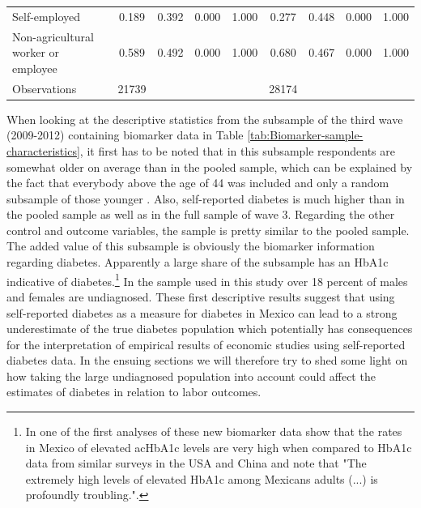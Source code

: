 \documentclass[12pt,english,british]{article}
\begin{document}
\begin{table}[h]
\begin{center}
\begin{adjustbox}{max width=\textwidth}
{\begin{tabular}{l*{2}{cccc}}
Self-employed       &       0.189&       0.392&       0.000&       1.000&       0.277&       0.448&       0.000&       1.000\\
Non-agricultural worker or employee&       0.589&       0.492&       0.000&       1.000&       0.680&       0.467&       0.000&       1.000\\
\midrule
Observations        &       21739&            &            &            &       28174&            &            &            \\
\bottomrule
\end{tabular}%
}
\end{adjustbox}
\end{center}


\end{table}

When looking at the descriptive statistics from the subsample of the third wave (2009-2012) containing biomarker data in Table \ref{tab:Biomarker-sample-characteristics}, it first has to be noted that in this subsample respondents are somewhat older on average than in the pooled sample, which can be explained by the fact that everybody above the age of 44 was included and only a random subsample of those younger \cite{Crimmins2015}. Also, self-reported diabetes is much higher than in the pooled sample as well as in the full sample of wave 3. Regarding the other control and outcome variables, the sample is pretty similar to the pooled sample. The added value of this subsample is obviously the biomarker information regarding diabetes. Apparently a large share of the subsample has an \ac{HbA1c} indicative of diabetes.\footnote{In one of the first analyses of these new biomarker data \citet{Frankenberg2015} show that the rates in Mexico of elevated ac{HbA1c} levels are very high when compared to \ac{HbA1c} data from similar surveys in the \ac{USA} and China and note that "The extremely high levels of elevated HbA1c among Mexicans adults (...) is profoundly troubling.".} In the sample used in this study over 18 percent of males and females are undiagnosed. These first descriptive results suggest that using self-reported diabetes as a measure for diabetes in Mexico can lead to a strong underestimate of the true diabetes population which potentially has consequences for the interpretation of empirical results of economic studies using self-reported diabetes data. In the ensuing sections we will therefore try to shed some light on how taking the large undiagnosed population into account could affect the estimates of diabetes in relation to labor outcomes. 
\end{document}
